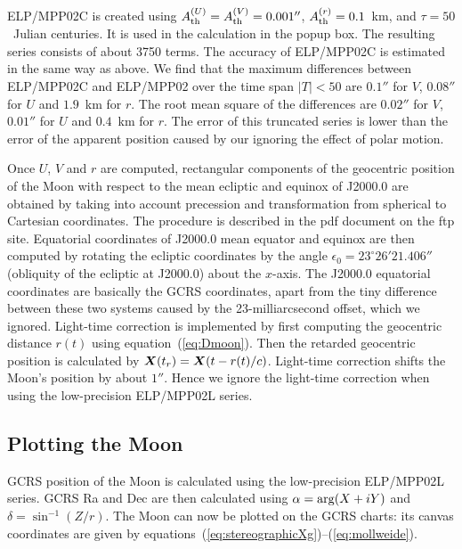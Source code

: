 \documentclass[12pt]{article}
\newcommand{\ve}[1]{\mbox{\boldmath $#1$}}
\begin{document}
ELP/MPP02C is created using $A^{(U)}_{\rm th}=A^{(V)}_{\rm th}=0.001''$, 
$A^{(r)}_{\rm th}=0.1$~km, and $\tau = 50$~Julian centuries. It is used in 
the calculation in the popup box. The resulting series consists of about 3750 terms. 
The accuracy of ELP/MPP02C is estimated in the same way as above. We find that 
the maximum differences between ELP/MPP02C and ELP/MPP02 over the time 
span $|T|<50$ are $0.1''$ for $V$, $0.08''$ for $U$ and $1.9$~km for $r$. 
The root mean square of the differences are $0.02''$ for $V$, $0.01''$ for 
$U$ and $0.4$~km for $r$. The error of this truncated series is lower than 
the error of the apparent position caused by our ignoring the effect of 
polar motion.

Once $U$, $V$ and $r$ are computed, rectangular components of the geocentric 
position of the Moon with respect to the mean ecliptic and equinox of J2000.0 
are obtained by taking into account precession and transformation from spherical 
to Cartesian coordinates. The procedure is described in the pdf document on the ftp site. 
Equatorial coordinates of J2000.0 mean equator and equinox are then computed 
by rotating the ecliptic coordinates by the angle $\epsilon_0=23^\circ 26' 21.406''$ 
(obliquity of the ecliptic at J2000.0) about the $x$-axis. 
The J2000.0 equatorial coordinates are basically the GCRS coordinates, 
apart from the tiny difference 
between these two systems caused by the 23-milliarcsecond offset, which we ignored. 
Light-time correction is implemented by first computing the geocentric 
distance $r(t)$ using equation~(\ref{eq:Dmoon}). Then the retarded geocentric 
position is calculated by $\ve{X}(t_r) = \ve{X}(t-r(t)/c)$. Light-time correction 
shifts the Moon's position by about $1''$. Hence we ignore the light-time 
correction when using the low-precision ELP/MPP02L series. 

\subsection{Plotting the Moon} 

GCRS position of the Moon is calculated using the low-precision ELP/MPP02L 
series. GCRS Ra and Dec are then calculated using $\alpha={\rm arg}(X+iY)$ 
and $\delta=\sin^{-1}(Z/r)$. The Moon can now be plotted 
on the GCRS charts: its canvas coordinates are given by 
equations~(\ref{eq:stereographicXg})--(\ref{eq:mollweide}).
\end{document}
